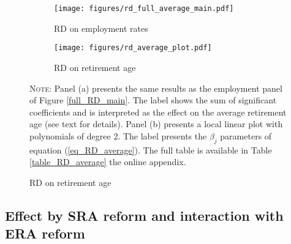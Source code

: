\documentclass[12pt,a4paper]{article}
\begin{document}

\vspace{0.2cm}
\begin{figure}[H]
	\begin{adjustwidth}{-1in}{-1in}	
\caption{Effect on average retirement age: comparison of two approaches}
\label{rd_comparison}
\centering
\begin{subfigure}{0.65\textwidth}
\centering
\caption{RD on employment rates}
\texttt{[image: figures/rd\_full\_average\_main.pdf]} %
\label{rd_comparison1}
\end{subfigure}%
\begin{subfigure}{0.65\textwidth}
\centering
\caption{RD on retirement age}
\texttt{[image: figures/rd\_average\_plot.pdf]} 	
\label{rd_comparison2}
\end{subfigure}
\begin{minipage}{15cm}%
\footnotesize
	\textsc{Note:} Panel (a) presents the same results as the employment panel of Figure \ref{full_RD_main}. The label shows the sum of significant coefficients and is interpreted as the effect on the average retirement age (see text for details). Panel (b) presents a local linear plot with polynomials of degree 2. The label presents the $\beta_j$ parameters of equation (\ref{eq_RD_average}). The full table is available in Table \ref{table_RD_average} the online appendix. 
\end{minipage}%
\end{adjustwidth}
\end{figure}

\subsection{Effect by SRA reform and interaction with ERA reform}
\label{sec_result_cutoff}
\end{document}
